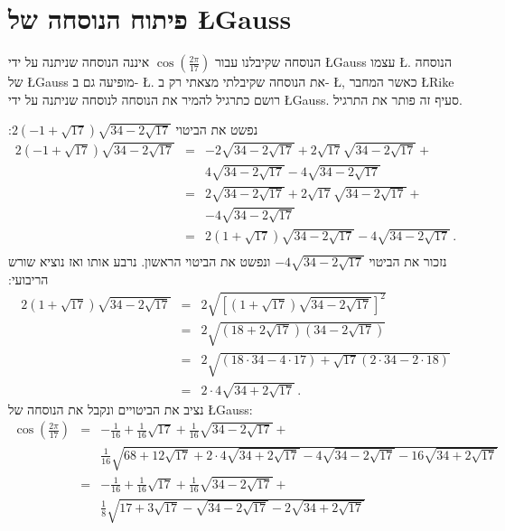 \documentclass[11pt,a4paper]{article}
\newenvironment{form}[1]{%
\begin{displaymath}%
\renewcommand{\arraystretch}{#1}%
\begin{array}{lcl}}%
{\end{array}%
\end{displaymath}%
}
\newcommand*{\disfrac}[2]{\displaystyle\frac{#1}{#2}}
\begin{document}
\clearpage

\section{פיתוח הנוסחה של %
\L{Gauss}%
}\label{s.derivation}

הנוסחה שקיבלנו עבור 
$\cos\left(\disfrac{2\pi}{17}\right)$
איננה הנוסחה שניתנה על ידי
\L{Gauss}
עצמו
\L{\cite[458 ]{gauss}}.
הנוסחה של 
\L{Gauss}
מופיעה גם ב-%
\L{\cite[68 ]{jorg}}.
את הנוסחה שקיבלתי מצאתי רק ב-%
\L{\cite{rike}},
כאשר המחבר
\L{Rike}
רושם כתרגיל להמיר את הנוסחה לנוסחה שניתנה על ידי 
\L{Gauss}.
סעיף זה פותר את התרגיל.

נפשט את הביטוי
$2(-1+\sqrt{17})\sqrt{34-2\sqrt{17}}$:
\begin{form}{1.7}
2(-1+\sqrt{17})\sqrt{34-2\sqrt{17}} &=&
-2\sqrt{34-2\sqrt{17}} +2\sqrt{17}\sqrt{34-2\sqrt{17}}+\\
&&4\sqrt{34-2\sqrt{17}}-4\sqrt{34-2\sqrt{17}}\\
&=&
2\sqrt{34-2\sqrt{17}} +2\sqrt{17}\sqrt{34-2\sqrt{17}}+\\
&&-4\sqrt{34-2\sqrt{17}}\\
&=&2(1+\sqrt{17})\sqrt{34-2\sqrt{17}}-4\sqrt{34-2\sqrt{17}}\,.\\
\end{form}
נזכור את הביטוי
$-4\sqrt{34-2\sqrt{17}}$
ונפשט את הביטוי הראשון. נרבע אותו ואז נוציא שורש הריבועי:
\begin{form}{1.8}
2(1+\sqrt{17})\sqrt{34-2\sqrt{17}}&=&
2\sqrt{\left[(1+\sqrt{17})\sqrt{34-2\sqrt{17}}\right]^2}\\
&=&2\sqrt{(18+2\sqrt{17})(34-2\sqrt{17})}\\
&=&2\sqrt{(18\cdot 34-4\cdot17)+\sqrt{17}(2\cdot 34 - 2\cdot 18)}\\
&=&2\cdot 4\sqrt{34+2\sqrt{17}}\,.
\end{form}
נציב את הביטויים ונקבל את הנוסחה של \L{Gauss}:
\begin{form}{2.2}
\cos\left(\disfrac{2\pi}{17}\right) &=& 
-\disfrac{1}{16}+\disfrac{1}{16}\sqrt{17} + 
     \disfrac{1}{16}\sqrt{34-2\sqrt{17}}
    + \\
    &&
     \disfrac{1}{16}\sqrt{
     68+12\sqrt{17} + 
     2\cdot 4\sqrt{34+2\sqrt{17}}-4\sqrt{34-2\sqrt{17}}
   -16
     \sqrt{34+2\sqrt{17}}
   }\\
&=&-\disfrac{1}{16}+\frac{1}{16}\sqrt{17} + 
     \disfrac{1}{16}\sqrt{34-2\sqrt{17}}
    + \\
    &&
     \disfrac{1}{8}\sqrt{
     17+3\sqrt{17} - 
     \sqrt{34-2\sqrt{17}}
   -2
     \sqrt{34+2\sqrt{17}}
   }
\end{form}
\end{document}
